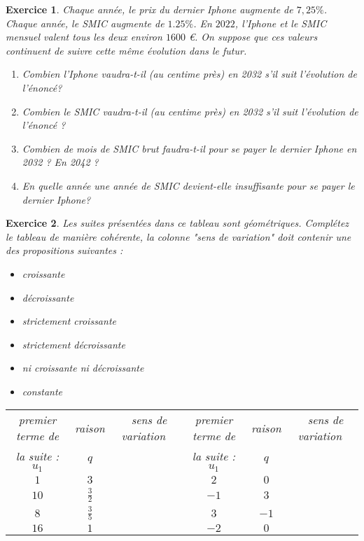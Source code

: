 \documentclass[10pt,a4paper]{article}
\newtheorem{exo}{Exercice}
\begin{document}
\begin{exo}
    Chaque année, le prix du dernier Iphone augmente de $7,25\%$. Chaque année, le SMIC augmente de $1.25\%$. 
    En $2022$, l'Iphone et le SMIC mensuel valent tous les deux environ $1600$ €. On suppose que ces valeurs continuent de suivre cette même évolution dans le futur.
    \begin{enumerate}
        \item Combien l'Iphone vaudra-t-il (au centime près) en 2032 s'il suit l'évolution de l'énoncé?
        \item Combien le SMIC vaudra-t-il (au centime près) en 2032 s'il suit l'évolution de l'énoncé ?
        \item Combien de mois de SMIC brut faudra-t-il pour se payer le dernier Iphone en 2032 ? En 2042 ?
        \item En quelle année une année de SMIC devient-elle insuffisante pour se payer le dernier Iphone?
    \end{enumerate}
\end{exo}
\begin{exo}
    Les suites présentées dans ce tableau sont géométriques.  Complétez le tableau de manière cohérente, la colonne "sens de variation" doit contenir une des propositions suivantes :\begin{multicols}{3}
        \begin{itemize}
            \item croissante
            \item décroissante
            \item strictement croissante
            \item strictement décroissante
            \item ni croissante ni décroissante
            \item constante
        \end{itemize}
    \end{multicols}
    \renewcommand*{\arraystretch}{2.5}
    \centering
    \begin{tabular}{|c|c|c||c|c|c|}
        \hline
             premier terme de  & raison &\texttt{      }sens de variation\texttt{      }& premier terme de  & raison &\texttt{      }sens de variation\texttt{      }\\
             la suite : $u_1$ & $q$ & &la suite : $u_1$ & $q$ & \\
         \hline
             $1$ & $3$ & &
             $2$ & $0$ & \\
         \hline
             $10$ & $\frac{3}{2}$ & &
             $-1$ & $3$ & \\
         \hline
             $8$ & $\frac{3}{5}$ & &
             $3$ & $-1$ & \\
         \hline
             $16$ & $1$ &  &
             $-2$ & $0$ &\\
         \hline
    \end{tabular}
\end{exo}
\end{document}
